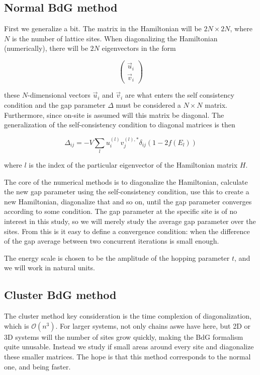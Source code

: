 \documentclass[11pt]{article}
\begin{document}
\subsection{Normal BdG method}

First we generalize a bit. The matrix in the Hamiltonian will be $2N \times 2N$, where $N$ is the number of lattice sites. When diagonalizing the Hamiltonian (numerically), there will be $2N$ eigenvectors in the form

\begin{equation}
	\begin{pmatrix} \vec{u}_i \\ \vec{v}_i \end{pmatrix} 
\end{equation}

these $N$-dimensional vectors $\vec{u}_i$ and $\vec{v}_i$ are what enters the self consistency condition and the gap parameter $\Delta$ must be considered a $N\times N$ matrix. Furthermore, since on-site is assumed will this matrix be diagonal. The generalization of the self-consistency condition to diagonal matrices is then

\begin{equation}
	\Delta_{ij} = -V \sum_l u_i^{(l)} v_j^{(l),*} \delta_{ij} (1 - 2f(E_l))
\end{equation}

where $l$ is the index of the particular eigenvector of the Hamiltonian matrix $H$. 

The core of the numerical methods is to diagonalize the Hamiltonian, calculate the new gap parameter using the self-consistency condition, use this to create a new Hamiltonian, diagonalize that and so on, until the gap parameter converges according to some condition. The gap parameter at the specific site is of no interest in this study, so we will merely study the average gap parameter over the sites. From this is it easy to define a convergence condition: when the difference of the gap average between two concurrent iterations is small enough. 

The energy scale is chosen to be the amplitude of the hopping parameter $t$, and we will work in natural units. 

\subsection{Cluster BdG method}

The cluster method key consideration is the time complexion of diagonalization, which is $\mathcal{O}(n^3)$. For larger systems, not only chains aswe have here, but 2D or 3D systems will the number of sites grow quickly, making the BdG formalism quite unusable. Instead we study if small areas around every site and diagonalize these smaller matrices. The hope is that this method corresponds to the normal one, and being faster. 
\end{document}
